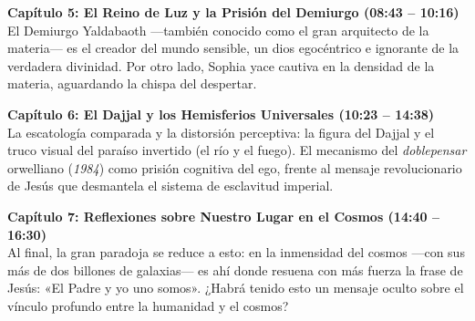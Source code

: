 \documentclass[10pt]{article}
\newenvironment{extraer}[1]{}{}
\begin{document}
	\begin{minipage}[t]{0.492\textwidth}
		\begin{tcolorbox}[contentStyle, width=\textwidth, equal height group=pagina2]
			\fontsize{7.2pt}{8.5pt}\selectfont\color{textgray}
			
			{\small\color{deepblue}\bfseries\begin{extraer}{cap5_title}Capítulo 5: El Reino de Luz y la Prisión del Demiurgo {\footnotesize\color{golddark}(08:43 -- 10:16)}\end{extraer}}\\[0.04cm]
			\justifying
			\begin{extraer}{cap5_desc}
				El Demiurgo Yaldabaoth —también conocido como el gran arquitecto de la materia— es el creador del mundo sensible, un dios egocéntrico e ignorante de la verdadera divinidad. Por otro lado, Sophia yace cautiva en la densidad de la materia, aguardando la chispa del despertar.
			\end{extraer}
			
			\vspace{0.12cm}
			
			{\small\color{deepblue}\bfseries\begin{extraer}{cap6_title}Capítulo 6: El Dajjal y los Hemisferios Universales {\footnotesize\color{golddark}(10:23 -- 14:38)}\end{extraer}}\\[0.04cm]
			\justifying
			\begin{extraer}{cap6_desc}
				La escatología comparada y la distorsión perceptiva: la figura del Dajjal y el truco visual del paraíso invertido (el río y el fuego). El mecanismo del \textit{doblepensar} orwelliano (\textit{1984}) como prisión cognitiva del ego, frente al mensaje revolucionario de Jesús que desmantela el sistema de esclavitud imperial.
			\end{extraer}
			
			\vspace{0.12cm}
			
			{\small\color{deepblue}\bfseries\begin{extraer}{cap7_title}Capítulo 7: Reflexiones sobre Nuestro Lugar en el Cosmos {\footnotesize\color{golddark}(14:40 -- 16:30)}\end{extraer}}\\[0.04cm]
			\justifying
			\begin{extraer}{cap7_desc}
				Al final, la gran paradoja se reduce a esto: en la inmensidad del cosmos —con sus más de dos billones de galaxias— es ahí donde resuena con más fuerza la frase de Jesús: «El Padre y yo uno somos». ¿Habrá tenido esto un mensaje oculto sobre el vínculo profundo entre la humanidad y el cosmos?
			\end{extraer}
			

\end{tcolorbox}
\end{minipage}
\end{document}
